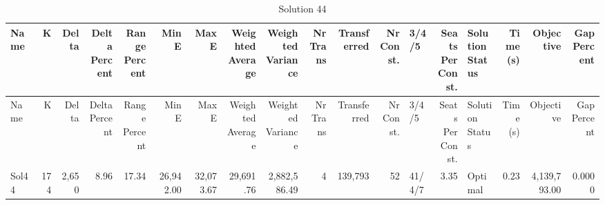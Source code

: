 \documentclass[a4paper]{article}
\begin{document}
{\scriptsize
\begin{longtable}{lrrrrrrrrrrrlrlrrr}
\caption{Solution 44}
\\ \toprule
Name &K &Delta &\shortstack{Delta\\Percent} &\shortstack{Range\\Percent} &Min E &Max E &\shortstack{Weighted\\Average} &\shortstack{Weighted\\Variance} &\shortstack{Nr\\Trans} &Transferred &\shortstack{Nr\\Const.} &3/4/5 &\shortstack{Seats\\Per\\Const.} &\shortstack{Solution\\Status} &\shortstack{Time\\(s)} &Objective &\shortstack{Gap\\Percent} \\ \midrule
\endfirsthead
\toprule
Name &K &Delta &\shortstack{Delta\\Percent} &\shortstack{Range\\Percent} &Min E &Max E &\shortstack{Weighted\\Average} &\shortstack{Weighted\\Variance} &\shortstack{Nr\\Trans} &Transferred &\shortstack{Nr\\Const.} &3/4/5 &\shortstack{Seats\\Per\\Const.} &\shortstack{Solution\\Status} &\shortstack{Time\\(s)} &Objective &\shortstack{Gap\\Percent} \\ \midrule
\endhead
\bottomrule
\endfoot
Sol44&174&2,650& 8.96&17.34&26,942.00&32,073.67&29,691.76&2,882,586.49&4&139,793&52&41/4/7& 3.35&Optimal& 0.23&4,139,793.00&0.0000\\ 
\end{longtable}

}
\end{document}
